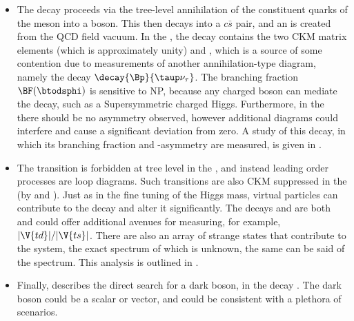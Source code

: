     \begin{itemize}
      \item
        The decay \btodsphi proceeds via the tree-level annihilation of the constituent quarks of the \Bp
        meson into a \Wp boson.
        This then decays into a $c\bar s$ pair, and an \ssbar is created from the QCD field vacuum.
        In the \sm, the decay contains the two CKM matrix elements  (which is approximately unity) and
        , which is a source of some contention due to measurements of another
        annihilation-type diagram, namely the decay $\decay{\Bp}{\taup\nu_\tau}$.
        The branching fraction $\BF(\btodsphi)$ is sensitive to NP, because any charged boson can mediate
        the decay, such as a Supersymmetric charged Higgs.
        Furthermore, in the \sm there should be no \CP asymmetry observed, however additional diagrams could
        interfere and cause a significant deviation from zero.
        A study of this decay, in which its branching fraction and \CP-asymmetry are measured, is given in
        .
      \item
        The \fcnc transition  is forbidden at tree level in the \sm, and instead
        leading order processes are loop diagrams.
        Such transitions are also CKM suppressed in the \sm (by  and ).
        Just as in the fine tuning of the Higgs mass, virtual \bsm particles can contribute to the decay and
        alter it significantly.
        The decays \btokpipimumu and \btophikmumu are both   and could offer
        additional avenues for measuring, for example, $|\V{td}|/|\V{ts}|$.
        There are also an array of strange states that contribute to the \kpipi system, the exact
        spectrum of which is unknown, the same can be said of the \phik spectrum.
        This analysis is outlined in .
      \item
        Finally,  describes the direct search for a dark boson, \decay{\db}{\mumu} in the
        decay \decay{\Bd}{\Kstarent\mumu}.
        The dark boson could be a scalar or vector, and could be consistent with a plethora of \bsm
        scenarios.
    \end{itemize}








